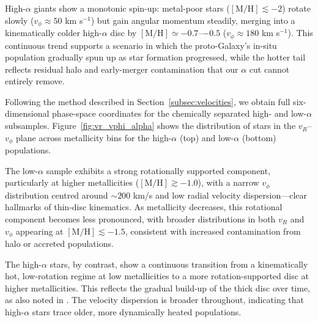 \documentclass[a4paper,12pt]{article}
\begin{document}
High-$\alpha$ giants show a monotonic spin-up:
metal-poor stars ($[\mathrm{M/H}]\lesssim-2$) rotate slowly
($v_\phi\!\approx\!50$ km s\(^{-1}\)) but gain angular momentum
steadily, merging into a kinematically colder high-$\alpha$
disc by $[\mathrm{M/H}]\simeq-0.7$–$-0.5$
($v_\phi\!\approx\!180$ km s\(^{-1}\)).  
This continuous trend supports a scenario in which the
proto-Galaxy’s in-situ population gradually spun up as star
formation progressed, while the hotter tail reflects residual halo
and early-merger contamination that our $\alpha$ cut cannot
entirely remove.

Following the method described in Section~\ref{subsec:velocities}, we obtain full six-dimensional
phase-space coordinates for the chemically separated high- and low-$\alpha$ subsamples.
Figure~\ref{fig:vr_vphi_alpha} shows the distribution of stars in the $v_R$–$v_\phi$ plane
across metallicity bins for the high-$\alpha$ (top) and low-$\alpha$ (bottom) populations.

The low-$\alpha$ sample exhibits a strong rotationally supported component, particularly at
higher metallicities ($[\mathrm{M/H}] \gtrsim -1.0$), with a narrow $v_\phi$ distribution centred
around $\sim200$ km/s and low radial velocity dispersion—clear hallmarks of thin-disc kinematics.
As metallicity decreases, this rotational component becomes less pronounced, with broader
distributions in both $v_R$ and $v_\phi$ appearing at $[\mathrm{M/H}] \lesssim -1.5$, consistent
with increased contamination from halo or accreted populations.

The high-$\alpha$ stars, by contrast, show a continuous transition from a kinematically hot,
low-rotation regime at low metallicities to a more rotation-supported disc at higher
metallicities. This reflects the gradual build-up of the thick disc over time, as also noted in
\citet{Chandra_2024}. The velocity dispersion is broader throughout,
indicating that high-$\alpha$ stars trace older, more dynamically heated populations.
\end{document}
